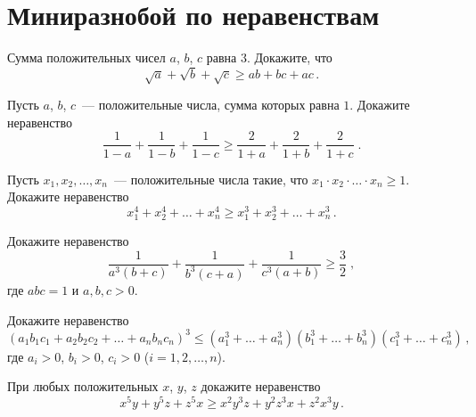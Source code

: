 
\section*{Миниразнобой по неравенствам}

\begin{problems}

\item
Сумма положительных чисел $a$, $b$, $c$ равна $3$.
Докажите, что
\[
    \sqrt{a} + \sqrt{b} + \sqrt{c}
\geq
    a b + b c + a c
\,.\]

\item
Пусть $a$, $b$, $c$~--- положительные числа, сумма которых равна $1$.
Докажите неравенство
\[
    \frac{1}{1 - a} + \frac{1}{1 - b} + \frac{1}{1 - c}
\geq
    \frac{2}{1 + a} + \frac{2}{1 + b} + \frac{2}{1 + c}
\;.\]

\item
Пусть $x_1, x_2, \ldots, x_n$~--- положительные числа такие, что
$x_1 \cdot x_2 \cdot \ldots \cdot x_n \geq 1$.
Докажите неравенство
\[
    x_1^4 + x_2^4 + \ldots + x_n^4
\geq
    x_1^3 + x_2^3 + \ldots + x_n^3
\,.\]

\item
Докажите неравенство
\[
    \frac{1}{a^3 (b + c)} + \frac{1}{b^3 (c + a)} + \frac{1}{c^3 (a + b)}
\geq
    \frac{3}{2}
\;,\]
где $a b c = 1$ и $a, b, c > 0$.

\item
Докажите неравенство
\[
    (a_1 b_1 c_1 + a_2 b_2 c_2 + \ldots + a_n b_n c_n)^3
\leq
    (a_1^3 + \ldots + a_n^3) (b_1^3 + \ldots + b_n^3) (c_1^3 + \ldots + c_n^3)
\,,\]
где $a_i > 0$, $b_i > 0$, $c_i > 0$ ($i = 1, 2, \ldots, n$).

\item
При любых положительных $x$, $y$, $z$ докажите неравенство
\[
    x^5 y + y^5 z + z^5 x
\geq
    x^2 y^3 z + y^2 z^3 x + z^2 x^3 y
\,.\]

\end{problems}

